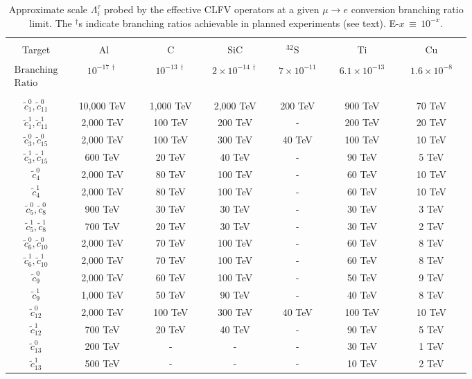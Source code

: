 \documentclass{book}[12pt]
\begin{document}
\begin{table}
\caption{Approximate scale $\Lambda_i^{\tau}$ probed by the effective CLFV operators at a given $\mu \rightarrow e$ conversion branching ratio limit.  The $^\dagger$s indicate  
branching ratios achievable in planned experiments (see text).   E-$x \, \equiv \,10^{-x}.$}
\label{tab:LECscale}
\begin{tabular}{|c|c|c|c|c|c|c|}
\hline
 & & & & & &  \\[-7.5pt]
Target  &~~~~~ Al~~~~~&~~~~~C~~~~~&~~~~SiC~~~~&~~~$^{32}$S~~~~~&~~~~~Ti~~~~~&~~~~~Cu~~~~~ \\[1.6pt]
\hline 
 & & & & & &  \\[-7.5pt]
$\begin{array}{l} \mathrm{Branching} \\  \mathrm{Ratio} \end{array}$ & $10^{-17 \, \dagger}$ & $10^{-13 \, \dagger}$ & $2 \times 10^{-14 \, \dagger}$ & $7 \times 10^{-11}$ \cite{BADERTSCHER1982406} &  $6.1 \times 10^{-13}$ \cite{wintz} & $1.6 \times 10^{-8}$ \cite{PhysRevLett.28.1469} \\
 & & & & & &  \\[-7.5pt]
\hline
 & & & & & &  \\[-5.5pt]
$\tilde{c}_1^0,\tilde{c}_{11}^0$ &  10,000 TeV & 1,000 TeV & 2,000 TeV & 200 TeV & 900 TeV & 70 TeV\\
$\tilde{c}_1^1,\tilde{c}_{11}^1$ & 2,000 TeV & 100 TeV & 200 TeV & - & 200 TeV & 20 TeV\\
$\tilde{c}_3^0,\tilde{c}_{15}^0$ & 2,000 TeV & 100 TeV & 300 TeV & 40 TeV & 100 TeV & 10 TeV\\
$\tilde{c}_3^1,\tilde{c}_{15}^1$ & 600 TeV & 20 TeV & 40 TeV & - & 90 TeV & 5 TeV\\
$\tilde{c}_4^0$ & 2,000 TeV & 80 TeV & 100 TeV & - & 60 TeV & 10 TeV\\
$\tilde{c}_4^1$ & 2,000 TeV & 80 TeV & 100 TeV & - & 60 TeV & 10 TeV\\
$\tilde{c}_5^0,\tilde{c}_8^0$ & 900 TeV & 30 TeV & 30 TeV & - & 30 TeV & 3 TeV\\
$\tilde{c}_5^1,\tilde{c}_8^1$ & 700 TeV & 20 TeV & 30 TeV & - & 30 TeV & 2 TeV\\
$\tilde{c}_6^0,\tilde{c}_{10}^0$ & 2,000 TeV & 70 TeV & 100 TeV & - & 60 TeV & 8 TeV\\
$\tilde{c}_6^1,\tilde{c}_{10}^1$ & 2,000 TeV & 70 TeV & 100 TeV & - & 60 TeV & 8 TeV\\
$\tilde{c}_9^0$ & 2,000 TeV & 60 TeV & 100 TeV & - & 50 TeV & 9 TeV\\
$\tilde{c}_9^1$ & 1,000 TeV & 50 TeV & 90 TeV & - & 40 TeV & 8 TeV\\
$\tilde{c}_{12}^0$ & 2,000 TeV & 100 TeV & 300 TeV & 40 TeV & 100 TeV & 10 TeV\\
$\tilde{c}_{12}^1$ & 700 TeV & 20 TeV & 40 TeV & - & 90 TeV & 5 TeV\\
$\tilde{c}_{13}^0$ & 200 TeV & - & - & - & 30 TeV & 1 TeV\\
$\tilde{c}_{13}^1$ & 500 TeV & - & - & - & 10 TeV & 2 TeV\\[2.6pt]
\hline
\end{tabular}
\end{table} 
\end{document}
